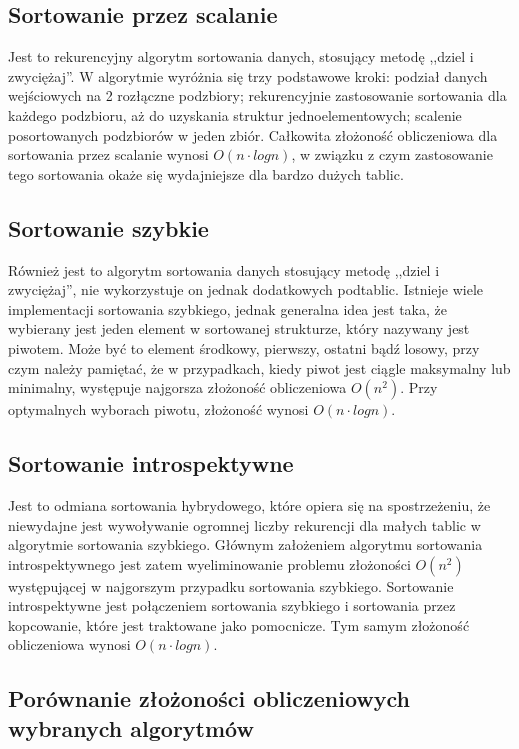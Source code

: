 \subsection{Sortowanie przez scalanie}
Jest to rekurencyjny algorytm sortowania danych, stosujący metodę ,,dziel i zwyciężaj''. W algorytmie wyróżnia się trzy podstawowe kroki: podział danych wejściowych na 2 rozłączne podzbiory; rekurencyjnie zastosowanie sortowania dla każdego podzbioru, aż do uzyskania struktur jednoelementowych; scalenie posortowanych podzbiorów w jeden zbiór. Całkowita złożoność obliczeniowa dla sortowania przez scalanie wynosi $O(n \cdot log n)$, w związku z czym zastosowanie tego sortowania okaże się wydajniejsze dla bardzo dużych tablic.


\subsection{Sortowanie szybkie}
Również jest to algorytm sortowania danych stosujący metodę ,,dziel i zwyciężaj'', nie wykorzystuje on jednak dodatkowych podtablic. Istnieje wiele implementacji sortowania szybkiego, jednak generalna idea jest taka, że wybierany jest jeden element w sortowanej strukturze, który nazywany jest piwotem. Może być to element środkowy, pierwszy, ostatni bądź losowy, przy czym należy pamiętać, że w przypadkach, kiedy piwot jest ciągle maksymalny lub minimalny, występuje najgorsza złożoność obliczeniowa $O(n^2)$. Przy optymalnych wyborach piwotu, złożoność wynosi $O(n \cdot log n)$. 


\subsection{Sortowanie introspektywne}
Jest to odmiana sortowania hybrydowego, które opiera się na spostrzeżeniu, że niewydajne jest wywoływanie ogromnej liczby rekurencji dla małych tablic w algorytmie sortowania szybkiego. Głównym założeniem algorytmu sortowania introspektywnego jest zatem wyeliminowanie problemu złożoności $O(n^2)$ występującej w najgorszym przypadku sortowania szybkiego. Sortowanie introspektywne jest połączeniem sortowania szybkiego i sortowania przez kopcowanie, które jest traktowane jako pomocnicze. Tym samym złożoność obliczeniowa wynosi $O(n \cdot log n)$.


\subsection{Porównanie złożoności obliczeniowych wybranych algorytmów}


